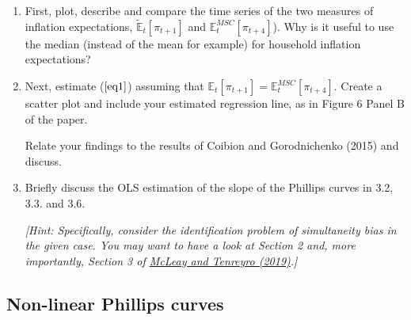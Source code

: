 \documentclass[dvipsnames,11pt]{article}
\begin{document}
        \begin{enumerate}[resume]
            \item First, plot, describe and compare the time series of the two measures of inflation expectations, $\mathbb{\widetilde{E}}_t[\pi_{t+1}]$ and $\mathbb{E}^{MSC}_t[\pi_{t+4}]$). Why is it useful to use the median (instead of the mean for example) for household inflation expectations?
        
                \begin{solution}
        
                    
                    
                \end{solution}
            
            \item Next, estimate ($\ref{eq1}$) assuming that $\mathbb{E}_t[\pi_{t+1}] = \mathbb{E}^{MSC}_t[\pi_{t+4}]$. Create a scatter plot and include your estimated regression line, as in Figure 6 Panel B of the paper.
            
                Relate your findings to the results of Coibion and Gorodnichenko (2015) and discuss.  
        
                \begin{solution}
        
                
                    
                \end{solution}
        
             \item Briefly discuss the OLS estimation of the slope of the Phillips curves in 3.2, 3.3. and 3.6. 
        
                \textit{[Hint: Specifically, consider the identification problem of simultaneity bias in the given case. You may want to have a look at Section 2 and, more importantly, Section 3 of \href{https://www.journals.uchicago.edu/doi/full/10.1086/707181}{McLeay and Tenreyro (2019)}.]}
        
                \begin{solution}
        
                    
                    
                \end{solution}
                
        \end{enumerate}

    \subsection{Non-linear Phillips curves}
\end{document}
